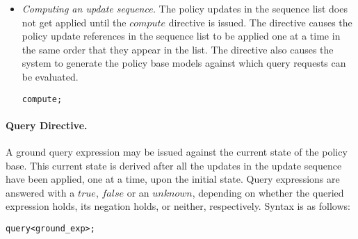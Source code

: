 \documentclass[global,twocolumn,final]{svjour}
\newenvironment{vverbatim}
  {\begin{alltt}}
  {\vspace{-\baselineskip}\end{alltt}}
\begin{document}
\begin{itemize}
          \item
            {\em Computing an update sequence.}
            The policy updates in the sequence list does not get applied until
            the $compute$ directive is issued. The directive causes the policy
            update references in the sequence list to be applied one at a time
            in the same order that they appear in the list. The directive also
            causes the system to generate the policy base models against which
            query requests can be evaluated.

            \begin{vverbatim}
  compute;
            \end{vverbatim}
        \end{itemize}

        \paragraph{Query Directive.}

          A ground query expression may be issued against the current state of
          the policy base. This current state is derived after all the updates
          in the update sequence have been applied, one at a time, upon the
          initial state. Query expressions are answered with a $true$, $false$
          or an $unknown$, depending on whether the queried expression holds,
          its negation holds, or neither, respectively. Syntax is as follows:

          \begin{vverbatim}
  query <ground\_exp>;
          \end{vverbatim}
\end{document}
